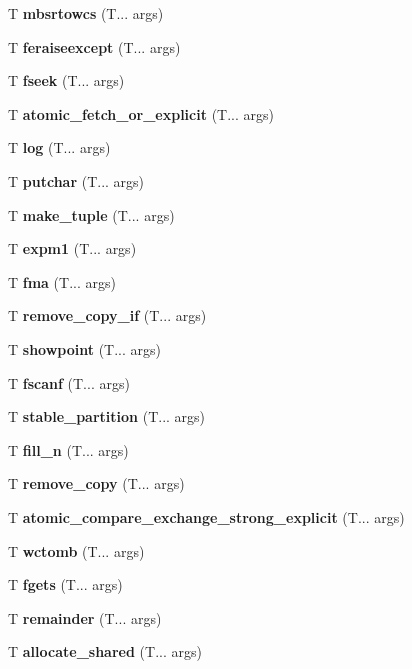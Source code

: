\begin{DoxyCompactItemize}
T \textbf{ mbsrtowcs} (T... args)
\item 
\mbox{\label{feraiseexcept}} 
T \textbf{ feraiseexcept} (T... args)
\item 
\mbox{\label{fseek}} 
T \textbf{ fseek} (T... args)
\item 
\mbox{\label{atomic_fetch_or}} 
T \textbf{ atomic\+\_\+fetch\+\_\+or\+\_\+explicit} (T... args)
\item 
\mbox{\label{log}} 
T \textbf{ log} (T... args)
\item 
\mbox{\label{putchar}} 
T \textbf{ putchar} (T... args)
\item 
\mbox{\label{make_tuple}} 
T \textbf{ make\+\_\+tuple} (T... args)
\item 
\mbox{\label{expm1}} 
T \textbf{ expm1} (T... args)
\item 
\mbox{\label{fma}} 
T \textbf{ fma} (T... args)
\item 
\mbox{\label{remove_copy}} 
T \textbf{ remove\+\_\+copy\+\_\+if} (T... args)
\item 
\mbox{\label{showpoint}} 
T \textbf{ showpoint} (T... args)
\item 
\mbox{\label{fscanf}} 
T \textbf{ fscanf} (T... args)
\item 
\mbox{\label{stable_partition}} 
T \textbf{ stable\+\_\+partition} (T... args)
\item 
\mbox{\label{fill_n}} 
T \textbf{ fill\+\_\+n} (T... args)
\item 
\mbox{\label{remove_copy}} 
T \textbf{ remove\+\_\+copy} (T... args)
\item 
\mbox{\label{atomic_compare_exchange}} 
T \textbf{ atomic\+\_\+compare\+\_\+exchange\+\_\+strong\+\_\+explicit} (T... args)
\item 
\mbox{\label{wctomb}} 
T \textbf{ wctomb} (T... args)
\item 
\mbox{\label{fgets}} 
T \textbf{ fgets} (T... args)
\item 
\mbox{\label{remainder}} 
T \textbf{ remainder} (T... args)
\item 
\mbox{\label{allocate_shared}} 
T \textbf{ allocate\+\_\+shared} (T... args)

\end{DoxyCompactItemize}
